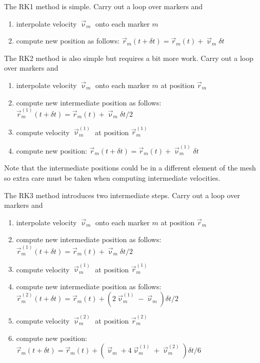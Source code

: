 The RK1 method is simple. Carry out a loop over markers and 
\begin{enumerate}
\item interpolate velocity $\vec\upnu_{m}$ onto each marker $m$
\item compute new position as follows: $\vec r_m(t+\delta t)=\vec r_m(t) + \vec\upnu_m \delta t$
\end{enumerate}

The RK2 method is also simple but requires a bit more work. Carry out a loop over markers and 
\begin{enumerate}
\item interpolate velocity $\vec\upnu_{m}$ onto each marker $m$ at position $\vec r_m$
\item compute new intermediate position as follows: $\vec r_m^{(1)}(t+\delta t)=\vec r_m(t) + \vec\upnu_m \delta t/2$
\item compute velocity $\vec\upnu_{m}^{(1)}$ at position $\vec r_m^{(1)}$
\item compute new position: $\vec r_m(t+\delta t)=\vec r_m(t) + \vec\upnu_m^{(1)} \delta t$ 
\end{enumerate}
Note that the intermediate positions could be in a different element of the mesh so extra care must be taken when 
computing intermediate velocities. 

The RK3 method introduces two intermediate steps. Carry out a loop over markers and 
\begin{enumerate}
\item interpolate velocity $\vec\upnu_{m}$ onto each marker $m$ at position $\vec r_m$
\item compute new intermediate position as follows: $\vec r_m^{(1)}(t+\delta t)=\vec r_m(t) + \vec\upnu_m \delta t/2$
\item compute velocity $\vec\upnu_{m}^{(1)}$ at position $\vec r_m^{(1)}$
\item compute new intermediate position as follows: 
$\vec r_m^{(2)}(t+\delta t)=\vec r_m(t) + (2\vec\upnu_m^{(1)}-\vec\upnu_m) \delta t/2$
\item compute velocity $\vec\upnu_{m}^{(2)}$ at position $\vec r_m^{(2)}$
\item compute new position: 
$\vec r_m(t+\delta t)=\vec r_m(t) + (\vec\upnu_m +4 \vec\upnu_m^{(1)} + \vec\upnu_m^{(2)}    )\delta t/6$ 
\end{enumerate}



